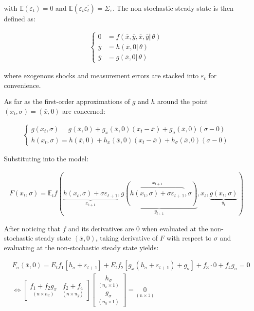 \documentclass{pracamgr}
\numberwithin{equation}{section}
\begin{document}
with $\mathbb{E}(\varepsilon_{t}) = 0$ and $\mathbb{E}(\varepsilon_{t} \varepsilon_{t}^{'} ) = \Sigma_{\varepsilon}$. The non-stochastic steady state is then defined as:

\begin{align}
\left\{
\begin{array}{cl}
0 &= f \left(\bar{x}, \bar{y}, \bar{x}, \bar{y}| \, \theta \right) \\
\bar{y} &= h \left( \bar{x}, 0 | \, \theta \right) \\
\bar{y} &= g \left( \bar{x}, 0 | \, \theta \right)
\end{array}
\right.
\end{align}

where exogenous shocks and measurement errors are stacked into $\varepsilon_{t}$ for convenience.

As far as the first-order approximations of $g$ and $h$ around the point $(x_{t}, \sigma) = (\bar{x}, 0)$ are concerned:

\begin{align}
\left\{
\begin{array}{cl}
g(x_{t}, \sigma) = g(\bar{x}, 0) + g_{x}(\bar{x}, 0)(x_{t} - \bar{x}) + g_{\sigma}(\bar{x}, 0)(\sigma - 0) \\
h(x_{t}, \sigma) = h(\bar{x}, 0) + h_{x}(\bar{x}, 0)(x_{t} - \bar{x}) + h_{\sigma}(\bar{x}, 0)(\sigma - 0)
\end{array}
\right.
\end{align}

Substituting into the model:

\begin{align}
F(x_{t}, \sigma) = \mathbb{E}_{t} f \left( \underbrace{h(x_{t}, \sigma) + \sigma \varepsilon_{t+1}}_{x_{t+1}}, \underbrace{g \left( \overbrace{h\left(x_{t}, \sigma \right) + \sigma \varepsilon_{t+1}}^{x_{t+1}}, \sigma \right)}_{y_{t+1}}, x_{t}, \underbrace{g(x_{t}, \sigma)}_{y_{t}} \right)
\end{align}

After noticing that $f$ and its derivatives are 0 when evaluated at the non-stochastic steady state $\left(\bar{x}, 0\right)$, taking derivative of $F$ with respect to $\sigma$ and evaluating at the non-stochastic steady state yields:

\begin{eqnarray}
&F_\sigma(\overline{x},0) = E_t f_1[h_\sigma + \varepsilon_{t+1}] + E_t f_2 [g_x(h_\sigma+ \varepsilon_{t+1})+g_\sigma] + f_3\cdot 0 + f_4 g_\sigma = 0 \nonumber \\
 &  \iff \begin{bmatrix} \underset{(n \times n_x)}{f_1 + f_2 g_x} & \underset{(n\times n_y)}{f_2 +f_4}\end{bmatrix} \begin{bmatrix} \underset{(n_x \times 1)}{h_\sigma} \\ \underset{(n_y \times 1)}{g_\sigma} \end{bmatrix} = \underset{(n \times 1)}{0}
  \end{eqnarray}
\end{document}
